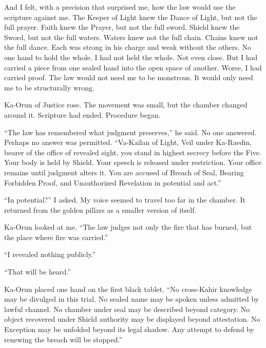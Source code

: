 And I felt, with a precision that surprised me, how the law would use the scripture against me. The Keeper of Light knew the Dance of Light, but not the full prayer. Faith knew the Prayer, but not the full sword. Shield knew the Sword, but not the full waters. Waters knew not the full chain. Chains knew not the full dance. Each was strong in his charge and weak without the others. No one hand to hold the whole. I had not held the whole. Not even close. But I had carried a piece from one sealed hand into the open space of another. Worse, I had carried proof. The law would not need me to be monstrous. It would only need me to be structurally wrong.\par

Ka-Orun of Justice rose. The movement was small, but the chamber changed around it. Scripture had ended. Procedure began.\par

``The law has remembered what judgment preserves,'' he said. No one answered. Perhaps no answer was permitted. ``Va-Kailan of Light, Veil under Ka-Raedin, bearer of the office of revealed sight, you stand in highest secrecy before the Five. Your body is held by Shield. Your speech is released under restriction. Your office remains until judgment alters it. You are accused of Breach of Seal, Bearing Forbidden Proof, and Unauthorized Revelation in potential and act.''\par

``In potential?'' I asked. My voice seemed to travel too far in the chamber. It returned from the golden pillars as a smaller version of itself.\par

Ka-Orun looked at me. ``The law judges not only the fire that has burned, but the place where fire was carried.''\par

``I revealed nothing publicly.''\par

``That will be heard.''\par

Ka-Orun placed one hand on the first black tablet. ``No cross-Kahir knowledge may be divulged in this trial. No sealed name may be spoken unless admitted by lawful channel. No chamber under seal may be described beyond category. No object recovered under Shield authority may be displayed beyond attestation. No Exception may be unfolded beyond its legal shadow. Any attempt to defend by renewing the breach will be stopped.''\par

